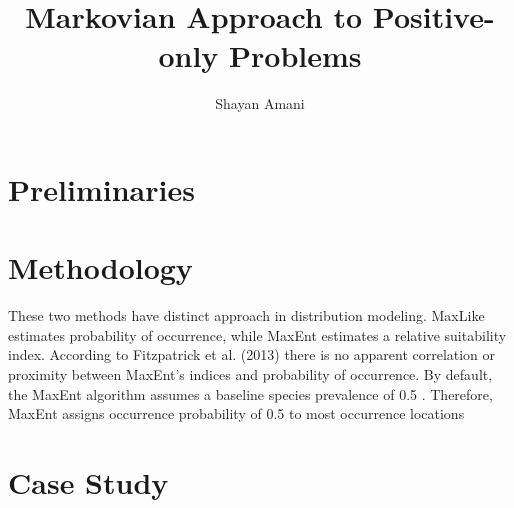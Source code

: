 \documentclass[a4paper,12pt]{article}
\title{Markovian Approach to Positive-only Problems}
\author{Shayan Amani}
\begin{document}
\maketitle

\section{Preliminaries}


\section{Methodology}
These two methods have distinct approach in distribution modeling. MaxLike estimates probability of occurrence, while MaxEnt estimates a relative suitability index. According to Fitzpatrick et al. (2013) there is no apparent correlation or proximity between MaxEnt’s indices and probability of occurrence. By default, the MaxEnt algorithm assumes a baseline species prevalence of 0.5 \cite{Phillips2008}. Therefore, MaxEnt assigns occurrence probability of 0.5 to most occurrence locations

\section{Case Study}







\end{document}
